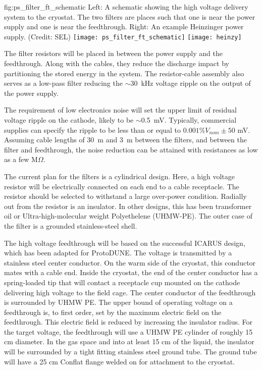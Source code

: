 \begin{dunefigure}{fig:ps_filter_ft_schematic}
{Left:  A schematic showing the high voltage delivery system to the cryostat.  The two filters are places such that one is near the power supply and one is near the feedthrough. Right:  An example Heinzinger power supply.  (Credit: SEL)}
\texttt{[image: ps\_filter\_ft\_schematic]}
\texttt{[image: heinzy]}
\end{dunefigure}
The filter resistors will be placed in between the power supply and the feedthrough.  Along with the cables, they reduce the discharge impact by partitioning the stored energy in the system.  The resistor-cable assembly also serves as a low-pass filter reducing the $\sim$\SI{30}{kHz} voltage ripple on the output of the power supply.

The requirement of low electronics noise will set the upper limit of residual voltage ripple on the cathode, likely to be $\sim$\SI{0.5}{mV}.  Typically, commercial supplies can specify the ripple to be less than or equal to $0.001\%V_{nom} \pm 50$ mV.  Assuming cable lengths of \SI{30}{m} and \SI{3}{m} between the filters, and between the filter and feedthrough, the noise reduction can be attained with resistances as low as a few M$\Omega$. 

The current plan for the filters is a cylindrical design.  Here, a high voltage resistor will be electrically connected on each end to a cable receptacle.  The resistor should be selected to withstand a large over-power condition.  Radially out from the resistor is an insulator.  In other designs, this has been transformer oil or Ultra-high-molecular weight Polyethelene (UHMW-PE).  The outer case of the filter is a grounded stainless-steel shell.

The high voltage feedthrough will be based on the successful ICARUS design, which has been adapted for ProtoDUNE.  The voltage is transmitted by a stainless steel center conductor.  On the warm side of the cryostat, this conductor mates with a cable end.  Inside the cryostat, the end of the center conductor has a spring-loaded tip that will contact a receptacle cup mounted on the cathode delivering high voltage to the field cage.  The center conductor of the feedthrough is surrounded by UHMW PE.  The upper bound of operating voltage on a feedthrough is, to first order, set by the maximum electric field on the feedthrough.  This electric field is reduced by increasing the insulator radius.  For the target voltage, the feedthrough will use a UHMW PE cylinder of roughly 15 cm diameter.  In the gas space and into at least 15 cm of the liquid, the insulator will be surrounded by a tight fitting stainless steel ground tube.  The ground tube will have a 25 cm Conflat flange welded on for attachment to the cryostat.

